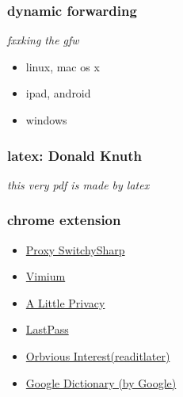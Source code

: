 \documentclass{beamer}
\begin{document}
\begin{frame}
  \frametitle{dynamic forwarding}

  \emph{fxxking the gfw} \\

  \begin{itemize}
  \item linux, mac os x \\
  \item ipad, android \\
    \pause
  \item windows \\
  \end{itemize}

\end{frame}






\begin{frame}
  \frametitle{latex: Donald Knuth}

  \emph{this very pdf is made by latex} \\



\end{frame}






\begin{frame}
  \frametitle{chrome extension}

  \begin{itemize}
  \item \href{http://code.google.com/p/switchysharp/wiki/SwitchySharp_GFW_List_2}{Proxy SwitchySharp} \\
    \pause
  \item \href{http://vimium.github.com/}{Vimium} \\
    \pause
  \item \href{https://chrome.google.com/webstore/detail/kjhmfidomefgpbbebodnbakelpabilga/details}{A Little Privacy} \\
    \pause
  \item \href{https://lastpass.com/}{LastPass} \\
    \pause
  \item \href{http://readitlaterlist.com/}{Orbvious Interest(readitlater)} \\
    \pause
  \item \href{https://chrome.google.com/webstore/detail/mgijmajocgfcbeboacabfgobmjgjcoja}{Google Dictionary (by Google)} \\
  \end{itemize}

\end{frame}
\end{document}
